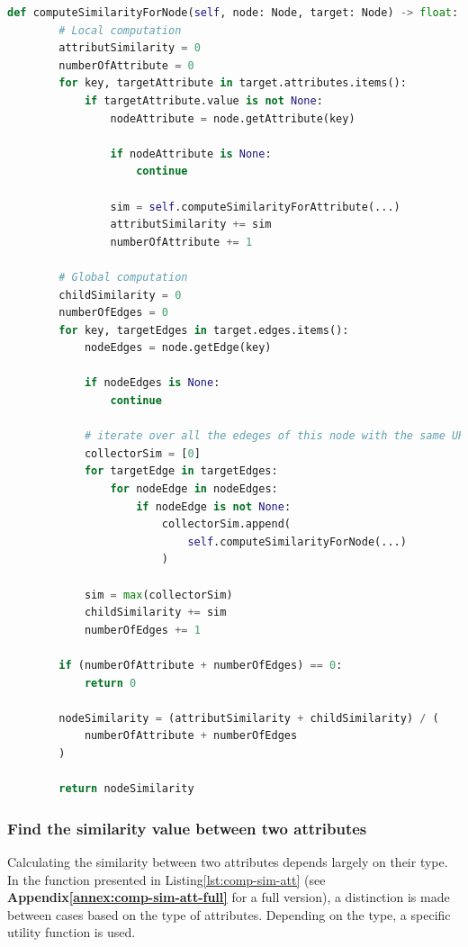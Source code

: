 \begin{lstlisting}[language=Python, caption=Function to find the similarity between one case and all the cases in the data-base, label={lst:comp-sim-node}]
def computeSimilarityForNode(self, node: Node, target: Node) -> float:
        # Local computation
        attributSimilarity = 0
        numberOfAttribute = 0
        for key, targetAttribute in target.attributes.items():
            if targetAttribute.value is not None:
                nodeAttribute = node.getAttribute(key)

                if nodeAttribute is None:
                    continue

                sim = self.computeSimilarityForAttribute(...)
                attributSimilarity += sim
                numberOfAttribute += 1

        # Global computation
        childSimilarity = 0
        numberOfEdges = 0
        for key, targetEdges in target.edges.items():
            nodeEdges = node.getEdge(key)

            if nodeEdges is None:
                continue

            # iterate over all the edeges of this node with the same URI
            collectorSim = [0]
            for targetEdge in targetEdges:
                for nodeEdge in nodeEdges:
                    if nodeEdge is not None:
                        collectorSim.append(
                            self.computeSimilarityForNode(...)
                        )

            sim = max(collectorSim)
            childSimilarity += sim
            numberOfEdges += 1

        if (numberOfAttribute + numberOfEdges) == 0:
            return 0

        nodeSimilarity = (attributSimilarity + childSimilarity) / (
            numberOfAttribute + numberOfEdges
        )

        return nodeSimilarity
\end{lstlisting}



\subsubsection{Find the similarity value between two attributes} 
Calculating the similarity between two attributes depends largely on their type. In the function presented in Listing\ref{lst:comp-sim-att} (see \textbf{Appendix\ref{annex:comp-sim-att-full}} for a full version), a distinction is made between cases based on the type of attributes. Depending on the type, a specific utility function is used.\\

